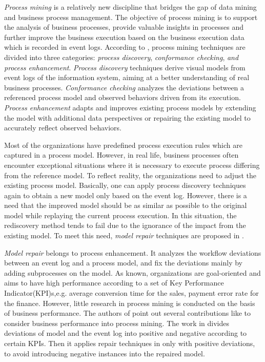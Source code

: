 %
\emph{Process mining} is a relatively new discipline that bridges the gap of data mining and business process management. The objective of process mining is to support the analysis of business processes, provide valuable insights in processes and further improve the business execution based on the business execution data which is recorded in event logs. According to \cite{van2011process}, process mining techniques are divided into three categories: \emph{process discovery}, \emph{conformance checking}, \emph{and process enhancement}. \emph{Process discovery} techniques derive visual models from event logs of the information system, aiming at a better understanding of real business processes. \emph{Conformance checking} analyzes the deviations between a referenced process model and observed behaviors driven from its execution. \emph{Process enhancement} adapts and improves existing process models by extending the model with additional data perspectives or repairing the existing model to accurately reflect observed behaviors. 

Most of the organizations have predefined process execution rules which are captured in a process model. However, in real life, business processes often encounter exceptional situations where it is necessary to execute process differing from the reference model. To reflect reality, the organizations need to adjust the existing process model. Basically, one can apply process discovery techniques again to obtain a new model only based on the event log. However, there is a need that the improved model should be as similar as possible to the original model while replaying the current process execution\cite{fahland2012repairing}. In this situation, the rediscovery method tends to fail due to the ignorance of the impact from the existing model. To meet this need, \emph{model repair} techniques are proposed in \cite{fahland2012repairing}.

\emph{Model repair} belongs to process enhancement\cite{fahland2012repairing}. It analyzes the workflow deviations between an event log and a process model, and fix the deviations mainly by adding subprocesses on the model. As known, organizations are goal-oriented and aims to have high performance according to a set of Key Performance Indicator(KPI)s,e.g. average conversion time for the sales, payment error rate for the finance.  However, little research in process mining is conducted on the basis of business performance\cite{ghasemi2019event}.  The authors of \cite{ghasemi2019event} point out several contributions like \cite{dees2017enhancing} to consider business performance into process mining. The work in \cite{dees2017enhancing} divides deviations of model and the event log into positive and negative according to certain KPIs. Then it applies repair techniques in \cite{fahland2015model} only with positive deviations, to avoid introducing negative instances into the repaired model. 

